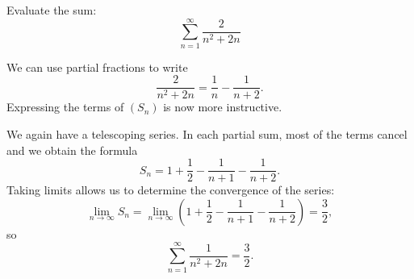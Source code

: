 \documentclass{ximera}
\begin{document}
\begin{example}
Evaluate the sum:
\[
\sum_{n=1}^\infty \frac{2}{n^2+2n}
\]
\begin{explanation}
We can use partial fractions to write
  \[
  \frac2{n^2+2n} = \frac1n-\frac1{n+2}.
  \]  
  Expressing the terms of $(S_n)$ is now more instructive.
  \begin{image}
  \end{image}
  We again have a telescoping series. In each partial sum, most of the
  terms cancel and we obtain the formula
  \[
  S_n =1+\frac12-\frac1{n+1}-\frac1{n+2}.
  \]
  Taking limits allows us to determine the convergence of the series:
  \[
  \lim_{n\to\infty}S_n = \lim_{n\to\infty} \left(1+\frac12-\frac1{n+1}-\frac1{n+2}\right) = \frac32,
  \]
  so
  \[
  \sum_{n=1}^\infty \frac1{n^2+2n} = \frac32.
  \]
\end{explanation}
\end{example}
\end{document}
